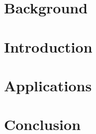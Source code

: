 \section[Back]{Background}


\section[Intro]{Introduction}


\section[Apps]{Applications}



\section[Concl]{Conclusion}
